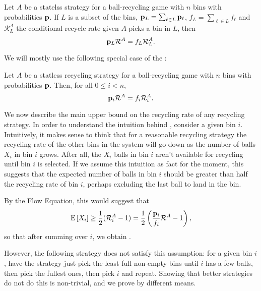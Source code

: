 \begin{lemma} \label{lem:gen-flow-equation}
	Let $A$ be a statelss strategy for a ball-recycling game with $n$ bins with
	probabilities $\mathbf{p}$. If $L$ is a subset of the bins, $\mathbf{p}_L = \sum_{\ell \in
	L} \mathbf{p}_\ell$, $f_L = \sum_{\ell \in L} f_\ell$ and $\mathcal{R}_L^A$ the
	conditional recycle rate given $A$ picks a bin in $L$, then
	\begin{equation}
		\mathbf{p}_L\mathcal{R}^A = f_L\mathcal{R}_L^A.
	\end{equation}
\end{lemma}

We will mostly use the following special case of the
: 

\begin{lemma} \label{lem:flow-equation}
	Let $A$ be a statless recycling strategy for a ball-recycling game with $n$
	bins with probabilities $\mathbf{p}$.  Then, for all $0\leq i < n$,
	\begin{equation}
		\mathbf{p}_i\mathcal{R}^A = f_i\mathcal{R}_i^A.
	\end{equation}
\end{lemma}

We now describe the main upper bound on the recycling rate of any recycling
strategy. In order to understand the intuition behind ,
consider a given bin $i$. Intuitively, it makes sense to think that for a
reasonable recycling strategy the recycling rate of the other bins in the
system will go down as the number of balls $X_i$ in bin $i$ grows.  After all,
the $X_i$ balls in bin $i$ aren't available for recycling until bin $i$ is
selected. If we assume this intuition as fact for the moment, this suggests
that the expected number of balls in bin $i$ should be greater than half the
recycling rate of bin $i$, perhaps excluding the last ball to land in the bin.

By the Flow Equation, this would suggest that
\[ \mathrm{E}\left[X_i\right] \geq \frac{1}{2}(\mathcal{R}_i^A - 1) =
\frac{1}{2}\left(\frac{\mathbf{p}_i}{f_i}\mathcal{R}^A - 1\right), \]
so that after summing over $i$, we obtain .

However, the following strategy does not satisfy this assumption: for a given
bin $i$, have the strategy just pick the least full non-empty bins until $i$
has a few balls, then pick the fullest ones, then pick $i$ and repeat. Showing
that better strategies do not do this is non-trivial, and we prove
 by different means.

